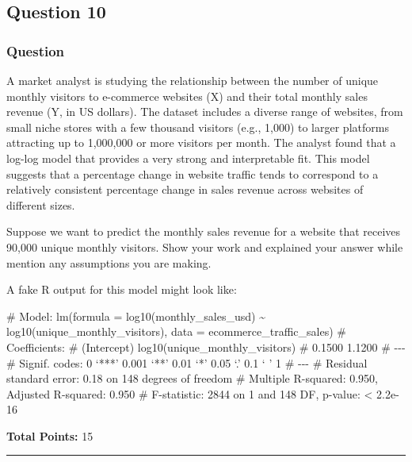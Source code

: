 \documentclass[
  letterpaper,
  DIV=11,
  numbers=noendperiod]{scrartcl}
\newenvironment{Shaded}{\begin{snugshade}}{\end{snugshade}}
\newcommand{\CommentTok}[1]{\textcolor[rgb]{0.37,0.37,0.37}{#1}}
\begin{document}
\subsection{Question 10}\label{question-10}

\subsubsection{Question}\label{question-3}

A market analyst is studying the relationship between the number of
unique monthly visitors to e-commerce websites (X) and their total
monthly sales revenue (Y, in US dollars). The dataset includes a diverse
range of websites, from small niche stores with a few thousand visitors
(e.g., 1,000) to larger platforms attracting up to 1,000,000 or more
visitors per month. The analyst found that a log-log model that provides
a very strong and interpretable fit. This model suggests that a
percentage change in website traffic tends to correspond to a relatively
consistent percentage change in sales revenue across websites of
different sizes.

Suppose we want to predict the monthly sales revenue for a website that
receives 90,000 unique monthly visitors. Show your work and explained
your answer while mention any assumptions you are making.

A fake R output for this model might look like:

\begin{Shaded}
\begin{Highlighting}[]
\CommentTok{\# Model: lm(formula = log10(monthly\_sales\_usd) \textasciitilde{} log10(unique\_monthly\_visitors), data = ecommerce\_traffic\_sales)}
\CommentTok{\# Coefficients:}
\CommentTok{\# (Intercept)                   log10(unique\_monthly\_visitors)}
\CommentTok{\# 0.1500                                 1.1200}
\CommentTok{\# {-}{-}{-}}
\CommentTok{\# Signif. codes:  0 ‘***’ 0.001 ‘**’ 0.01 ‘*’ 0.05 ‘.’ 0.1 ‘ ’ 1}
\CommentTok{\# {-}{-}{-}}
\CommentTok{\# Residual standard error: 0.18 on 148 degrees of freedom}
\CommentTok{\# Multiple R{-}squared: 0.950,    Adjusted R{-}squared: 0.950}
\CommentTok{\# F{-}statistic: 2844 on 1 and 148 DF,  p{-}value: \textless{} 2.2e{-}16}
\end{Highlighting}
\end{Shaded}

\textbf{Total Points:} 15

\begin{center}\rule{0.5\linewidth}{0.5pt}\end{center}
\end{document}
